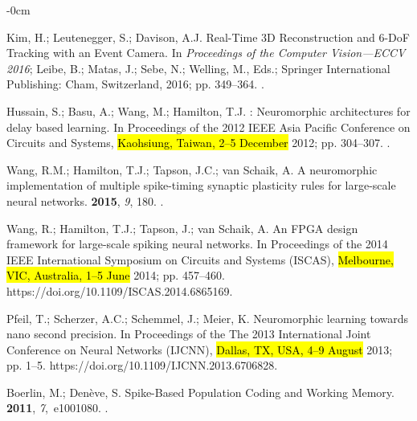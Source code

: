 \documentclass[brainsci, %
               review,accept,pdftex,moreauthors
               ]{Definitions/mdpi}
\begin{document}
\begin{adjustwidth}{-\extralength}{0cm}
\begin{thebibliography}{999}
Kim, H.; Leutenegger, S.; Davison, A.J.
\newblock Real-{Time} {3D} {Reconstruction} and 6-{DoF} {Tracking} with an
  {Event} {Camera}.
\newblock In \emph{Proceedings of the Computer {Vision}---{ECCV} 2016}; Leibe, B.;
  Matas, J.; Sebe, N.; Welling, M., Eds.; Springer International Publishing:
  Cham,  Switzerland, 2016;  pp. 349--364.
.

Hussain, S.; Basu, A.; Wang, M.; Hamilton, T.J.
: {Neuromorphic} architectures for delay based learning.
\newblock In Proceedings of the 2012 {IEEE} {Asia} {Pacific} {Conference} on
  {Circuits} and {Systems},  \hl{Kaohsiung, Taiwan, 2--5 December} %
 2012; pp. 304--307.
.

Wang, R.M.; Hamilton, T.J.; Tapson, J.C.; van Schaik, A.
\newblock A neuromorphic implementation of multiple spike-timing synaptic
  plasticity rules for large-scale neural networks.
 {\bf 2015}, {\em 9}, 180.
.

Wang, R.; Hamilton, T.J.; Tapson, J.; van Schaik, A.
\newblock An {FPGA} design framework for large-scale spiking neural networks.
\newblock In Proceedings of the 2014 {IEEE} {International} {Symposium} on
  {Circuits} and {Systems} ({ISCAS}), \hl{Melbourne, VIC, Australia, 1--5 June} %
 2014; pp. 457--460.
 {{https://doi.org/10.1109/ISCAS.2014.6865169}}.

Pfeil, T.; Scherzer, A.C.; Schemmel, J.; Meier, K.
\newblock Neuromorphic learning towards nano second precision.
\newblock In Proceedings of the The 2013 {International} {Joint} {Conference}
  on {Neural} {Networks} ({IJCNN}), \hl{Dallas, TX, USA, 4--9 August} %
 2013; pp. 1--5.
 {{https://doi.org/10.1109/IJCNN.2013.6706828}}.

Boerlin, M.; Denève, S.
\newblock Spike-{Based} {Population} {Coding} and {Working} {Memory}.
 {\bf 2011}, {\em 7},~e1001080.
.


\end{thebibliography}
\end{adjustwidth}
\end{document}
